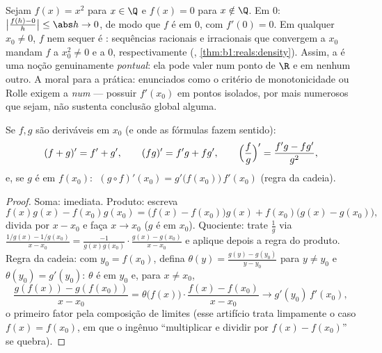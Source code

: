 \begin{example}\label{ex:b1:derivative:onepoint}
Sejam $f(x) = x^2$ para $x \in \Q$ e $f(x) = 0$ para $x \notin
\Q$. Em $0$: $\bigl|\frac{f(h) - 0}{h}\bigr| \leq \abs h \to 0$,
de modo que $f$ é  em $0$, com $f'(0) = 0$. Em qualquer $x_0
\neq 0$, $f$ nem sequer é : sequências racionais e
irracionais que convergem a $x_0$ mandam $f$ a $x_0^2 \neq 0$ e a
$0$, respectivamente (, \cref{thm:b1:reals:density}). Assim, a
 é uma noção genuinamente \emph{pontual}: ela pode
valer num ponto de $\R$ e em nenhum outro. A moral para
a prática: enunciados como o critério de monotonicidade ou Rolle
exigem a  \emph{num } --- possuir
$f'(x_0)$ em pontos isolados, por mais numerosos que sejam, não sustenta
conclusão global alguma.
\end{example}

\begin{theorem}[Operações]\label{thm:b1:derivative:operations}
Se $f, g$ são deriváveis em $x_0$ (e onde as fórmulas fazem
sentido):
\[
(f + g)' = f' + g', \qquad
(fg)' = f'g + fg', \qquad
\Bigl(\frac fg\Bigr)' = \frac{f'g - fg'}{g^2},
\]
e, se $g$ é  em $f(x_0)$:
$\;(g \circ f)'(x_0) = g'\bigl(f(x_0)\bigr)\, f'(x_0)$ (regra da
cadeia).
\end{theorem}

\begin{proof}
Soma: imediata. Produto: escreva
\[
f(x)g(x) - f(x_0)g(x_0)
= \bigl(f(x) - f(x_0)\bigr) g(x) + f(x_0)\bigl(g(x) - g(x_0)\bigr),
\]
divida por $x - x_0$ e faça $x \to x_0$ ($g$ é  em $x_0$).
Quociente: trate $\frac 1g$ via $\frac{1/g(x) - 1/g(x_0)}{x - x_0} =
\frac{-1}{g(x)g(x_0)}\cdot\frac{g(x) - g(x_0)}{x - x_0}$ e aplique depois
a regra do produto. Regra da cadeia: com $y_0 = f(x_0)$, defina
$\theta(y) = \frac{g(y) - g(y_0)}{y - y_0}$ para $y \neq y_0$ e
$\theta(y_0) = g'(y_0)$: $\theta$ é  em $y_0$ e, para
$x \neq x_0$,
\[
\frac{g(f(x)) - g(f(x_0))}{x - x_0}
= \theta\bigl(f(x)\bigr)\cdot \frac{f(x) - f(x_0)}{x - x_0}
\longrightarrow g'(y_0)\, f'(x_0),
\]
o primeiro fator pela composição de limites (esse artifício trata
limpamente o caso $f(x) = f(x_0)$, em que o ingênuo ``multiplicar e dividir
por $f(x) - f(x_0)$'' se quebra).
\end{proof}

